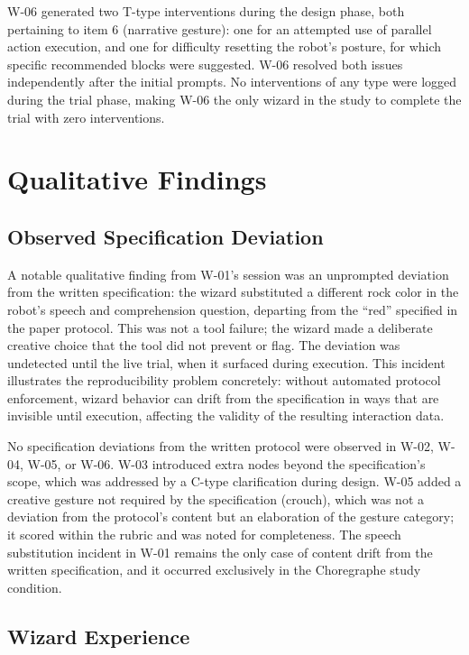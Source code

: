 W-06 generated two T-type interventions during the design phase, both pertaining to item 6 (narrative gesture): one for an attempted use of parallel action execution, and one for difficulty resetting the robot's posture, for which specific recommended blocks were suggested. W-06 resolved both issues independently after the initial prompts. No interventions of any type were logged during the trial phase, making W-06 the only wizard in the study to complete the trial with zero interventions.

\section{Qualitative Findings}
\label{sec:results-qualitative}

\subsection{Observed Specification Deviation}

A notable qualitative finding from W-01's session was an unprompted deviation from the written specification: the wizard substituted a different rock color in the robot's speech and comprehension question, departing from the ``red'' specified in the paper protocol. This was not a tool failure; the wizard made a deliberate creative choice that the tool did not prevent or flag. The deviation was undetected until the live trial, when it surfaced during execution. This incident illustrates the reproducibility problem concretely: without automated protocol enforcement, wizard behavior can drift from the specification in ways that are invisible until execution, affecting the validity of the resulting interaction data.

No specification deviations from the written protocol were observed in W-02, W-04, W-05, or W-06. W-03 introduced extra nodes beyond the specification's scope, which was addressed by a C-type clarification during design. W-05 added a creative gesture not required by the specification (crouch), which was not a deviation from the protocol's content but an elaboration of the gesture category; it scored within the rubric and was noted for completeness. The speech substitution incident in W-01 remains the only case of content drift from the written specification, and it occurred exclusively in the Choregraphe study condition.

\subsection{Wizard Experience}

